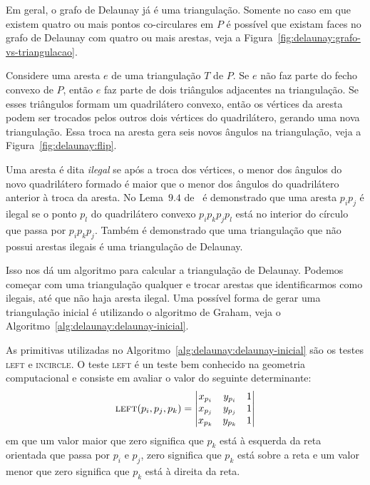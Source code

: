 

Em geral, o grafo de Delaunay já é uma triangulação.
Somente no caso em que existem quatro ou mais pontos co-circulares em $P$ é possível que existam
faces no grafo de Delaunay com quatro ou mais arestas, veja a
Figura~\ref{fig:delaunay:grafo-vs-triangulacao}.



Considere uma aresta $e$ de uma triangulação $T$ de $P$.
Se $e$ não faz parte do fecho convexo de $P$, então $e$ faz parte de dois triângulos adjacentes na
triangulação.
Se esses triângulos formam um quadrilátero convexo, então os vértices da aresta podem ser trocados
pelos outros dois vértices do quadrilátero, gerando uma nova triangulação.
Essa troca na aresta gera seis novos ângulos na triangulação, veja a
Figura~\ref{fig:delaunay:flip}.



Uma aresta é dita \textit{ilegal} se após a troca dos vértices, o menor dos ângulos do novo
quadrilátero formado é maior que o menor dos ângulos do quadrilátero anterior à troca da aresta.
No Lema~$9.4$ de~\cite{computationalgeometry} é demonstrado que uma aresta $p_{i}p_{j}$ é ilegal
se o ponto $p_{l}$ do quadrilátero convexo $p_{i}p_{k}p_{j}p_{l}$ está no interior do círculo que
passa por $p_{i}p_{k}p_{j}$.
Também é demonstrado que uma triangulação que não possui arestas ilegais é uma triangulação de
Delaunay.

Isso nos dá um algoritmo para calcular a triangulação de Delaunay.
Podemos começar com uma triangulação qualquer e trocar arestas que identificarmos como ilegais,
até que não haja aresta ilegal.
Uma possível forma de gerar uma triangulação inicial é utilizando o algoritmo de Graham, veja o
Algoritmo~\ref{alg:delaunay:delaunay-inicial}.



As primitivas utilizadas no Algoritmo~\ref{alg:delaunay:delaunay-inicial} são os testes
\textsc{left} e \textsc{incircle}.
O teste \textsc{left} é un teste bem conhecido na geometria computacional e consiste em avaliar o
valor do seguinte determinante:
$$\textsc{left}(p_i, p_j, p_k) =
\begin{vmatrix}
    x_{p_i} & y_{p_i} & 1 \\
    x_{p_j} & y_{p_j} & 1 \\
    x_{p_k} & y_{p_k} & 1
\end{vmatrix}$$
em que um valor maior que zero significa que $p_k$ está à esquerda da reta orientada que passa por
$p_i$ e $p_j$, zero significa que $p_k$ está sobre a reta e um valor menor que zero significa que
$p_k$ está à direita da reta.

